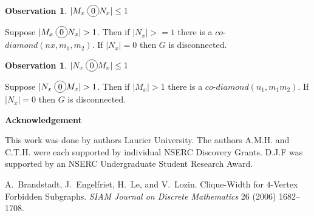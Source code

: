 \documentclass[12pt]{article}
\newcommand*\circled[1]{\tikz[baseline=(char.base)]{
            \node[shape=circle,draw,inner sep=2pt] (char) {#1};}}
\newtheorem{Observation}[Theorem]{Observation}
\begin{document}
\begin{Observation}\label{obs:mx-disjoin}
$|M_x \;\circled{0} N_x| \leq 1$
\end{Observation}
 Suppose $|M_x \;\circled{0} N_x| > 1$. Then if $|N_x| >= 1$ there is a $co$-$diamond (nx, m_1, m_2)$. If $|N_x| = 0$ then $G$ is disconnected.

\begin{Observation}\label{obs:nx-disjoin}
$|N_x \;\circled{0} M_x| \leq 1$
\end{Observation} 
 Suppose $|N_x \;\circled{0} M_x| > 1$. Then if $|M_x| > 1$ there is a $co$-$diamond (n_1, m_1m_2)$. If $|N_x| = 0$ then $G$ is disconnected.


\begin{center}
{\bf Acknowledgement}
\end{center}
This work was done by authors  Laurier University. The authors A.M.H. and C.T.H. were each supported by individual NSERC Discovery Grants. D.J.F was supported by an NSERC Undergraduate Student Research Award.


\clearpage
\begin{thebibliography}{99}


    A.~Brandstadt, J.~Engelfriet, H.~Le, and V.~Lozin. Clique-Width for $4$-Vertex Forbidden Subgraphs.  {\sl SIAM
     Journal on Discrete Mathematics} 26 (2006) 1682--1708.

\end{thebibliography}
\end{document}
